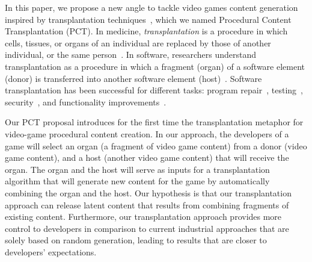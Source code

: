 In this paper, we propose a new angle to tackle video games content generation inspired by transplantation techniques~\cite{barr2015automated}, which we named Procedural Content Transplantation (PCT). In medicine, \textit{transplantation} is a procedure in which cells, tissues, or organs of an individual are replaced by those of another individual, or the same person~\cite{FARSHBAFNADI2023599}. In software, researchers understand transplantation as a procedure in which a fragment (organ) of a software element (donor) is transferred into another software element (host)~\cite{barr2015automated}. Software transplantation has been successful for different tasks: program repair~\cite{weimer2009automatically,sidiroglou2014automatic}, testing~\cite{zhang2017automated}, security~\cite{yang2017malware}, and functionality improvements~\cite{sidiroglou2017codecarboncopy}.

Our PCT proposal introduces for the first time the transplantation metaphor for video-game procedural content creation. In our approach, the developers of a game will select an organ (a fragment of video game content) from a donor (video game content), and a host (another video game content) that will receive the organ. The organ and the host will serve as inputs for a transplantation algorithm that will generate new content for the game by automatically combining the organ and the host. Our hypothesis is that our transplantation approach can release latent content that results from combining fragments of existing content. Furthermore, our transplantation approach provides more control to developers in comparison to current industrial approaches that are solely based on random generation, leading to results that are closer to developers' expectations.


